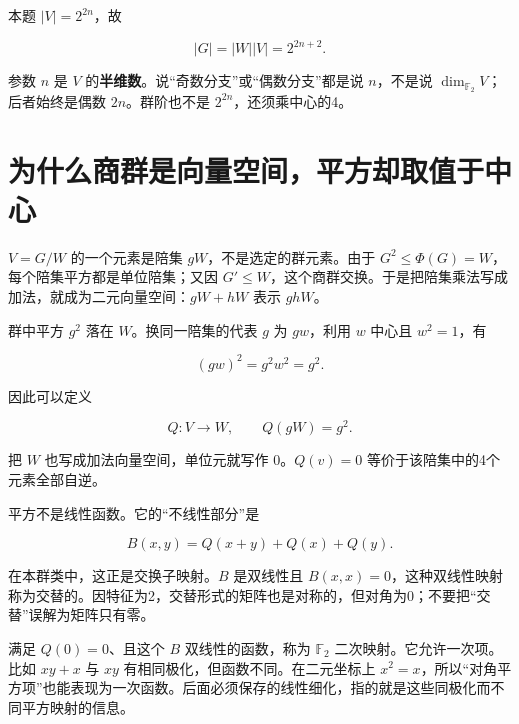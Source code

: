 \documentclass[UTF8,fontset=fandol,zihao=-4,openany,oneside]{ctexbook}
\begin{document}
本题 \(|V|=2^{2n}\)，故



\[
|G|=|W||V|=2^{2n+2}.
\]



参数 \(n\) 是 \(V\) 的\textbf{半维数}。说“奇数分支”或“偶数分支”都是说 \(n\)，不是说 \(\dim_{\mathbb F_2}V\)；后者始终是偶数 \(2n\)。群阶也不是 \(2^{2n}\)，还须乘中心的4。



\section{为什么商群是向量空间，平方却取值于中心}


\(V=G/W\) 的一个元素是陪集 \(gW\)，不是选定的群元素。由于 \(G^2\le\Phi(G)=W\)，每个陪集平方都是单位陪集；又因 \(G'\le W\)，这个商群交换。于是把陪集乘法写成加法，就成为二元向量空间：\(gW+hW\) 表示 \(ghW\)。



群中平方 \(g^2\) 落在 \(W\)。换同一陪集的代表 \(g\) 为 \(gw\)，利用 \(w\) 中心且 \(w^2=1\)，有



\[
(gw)^2=g^2w^2=g^2.
\]



因此可以定义



\[
Q:V\longrightarrow W,\qquad Q(gW)=g^2.
\]



把 \(W\) 也写成加法向量空间，单位元就写作 \(0\)。\(Q(v)=0\) 等价于该陪集中的4个元素全部自逆。



平方不是线性函数。它的“不线性部分”是



\[
B(x,y)=Q(x+y)+Q(x)+Q(y).
\]



在本群类中，这正是交换子映射。\(B\) 是双线性且 \(B(x,x)=0\)，这种双线性映射称为交替的。因特征为2，交替形式的矩阵也是对称的，但对角为0；不要把“交替”误解为矩阵只有零。



满足 \(Q(0)=0\)、且这个 \(B\) 双线性的函数，称为 \(\mathbb F_2\) 二次映射。它允许一次项。比如 \(xy+x\) 与 \(xy\) 有相同极化，但函数不同。在二元坐标上 \(x^2=x\)，所以“对角平方项”也能表现为一次函数。后面必须保存的线性细化，指的就是这些同极化而不同平方映射的信息。
\end{document}
